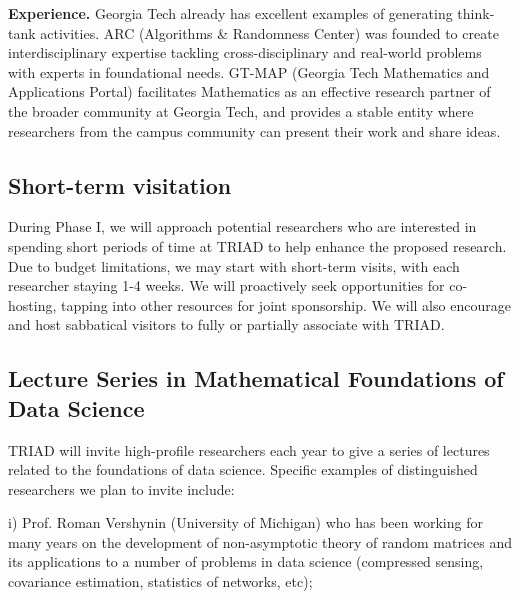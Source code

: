 \documentclass[12pt]{article}
\begin{document}
\medskip

\noindent
{\bf Experience.}
Georgia Tech already has excellent examples of generating think-tank activities.
ARC (Algorithms \& Randomness Center) was founded to create interdisciplinary expertise tackling cross-disciplinary and real-world problems with experts in foundational needs.
GT-MAP (Georgia Tech Mathematics and Applications Portal) facilitates Mathematics as an effective research partner of the broader community at Georgia Tech, and provides a stable entity where researchers from the campus community can present their work and share ideas.

\vspace*{-1em}

\subsection{Short-term visitation}
\label{sec:short-term}

During Phase I, we will approach potential researchers who are interested in spending short
periods of time at TRIAD to help enhance the proposed research.
Due to budget limitations, we may start with short-term visits, with each researcher staying
1-4 weeks.  We will proactively seek opportunities for co-hosting, tapping into other resources for joint sponsorship. We will also encourage and host sabbatical visitors to
fully or partially associate with TRIAD.


\vspace*{-1em}

\subsection{Lecture Series in Mathematical Foundations of Data Science}
\label{sec:lectures}

TRIAD will invite high-profile researchers each year to give a series of lectures related to the foundations of data science. Specific examples of distinguished researchers we plan to
invite include:

i) Prof. Roman Vershynin (University of Michigan) who has been working for many years on the development of non-asymptotic theory of random matrices and its applications to a number of problems in data science (compressed sensing, covariance estimation, statistics of networks, etc);
\end{document}
